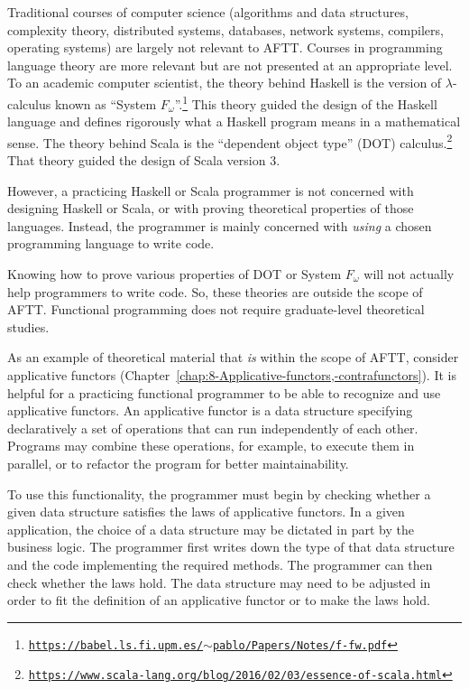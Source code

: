 Traditional courses of computer science (algorithms and data structures,
complexity theory, distributed systems, databases, network systems,
compilers, operating systems) are largely not relevant to AFTT. Courses
in programming language theory are more relevant but are not presented
at an appropriate level. To an academic computer scientist, the theory
behind Haskell is the version of $\lambda$-calculus known as
\textsf{``}System $F_{\omega}$\textsf{''}.\footnote{\texttt{\href{https://babel.ls.fi.upm.es/~pablo/Papers/Notes/f-fw.pdf}{https://babel.ls.fi.upm.es/$\sim$pablo/Papers/Notes/f-fw.pdf}}}
This theory guided the design of the Haskell language and defines
rigorously what a Haskell program means in a mathematical sense. The
theory behind Scala is the \textsf{``}dependent object type\textsf{''} (DOT) calculus.\footnote{\texttt{\href{https://www.scala-lang.org/blog/2016/02/03/essence-of-scala.html}{https://www.scala-lang.org/blog/2016/02/03/essence-of-scala.html}}}
That theory guided the design of Scala version 3.

However, a practicing Haskell or Scala programmer is not concerned
with designing Haskell or Scala, or with proving theoretical properties
of those languages. Instead, the programmer is mainly concerned with
\emph{using} a chosen programming language to write code. 

Knowing how to prove various properties of DOT or System $F_{\omega}$
will not actually help programmers to write code. So, these theories
are outside the scope of AFTT. Functional programming does not require
graduate-level theoretical studies.

As an example of theoretical material that \emph{is} within the scope
of AFTT, consider applicative functors (Chapter~\ref{chap:8-Applicative-functors,-contrafunctors}).
It is helpful for a practicing functional programmer to be able to
recognize and use applicative functors. An applicative functor is
a data structure specifying declaratively a set of operations that
can run independently of each other. Programs may combine these operations,
for example, to execute them in parallel, or to refactor the program
for better maintainability.

To use this functionality, the programmer must begin by checking whether
a given data structure satisfies the laws of applicative functors.
In a given application, the choice of a data structure may be dictated
in part by the business logic. The programmer first writes down the
type of that data structure and the code implementing the required
methods. The programmer can then check whether the laws hold. The
data structure may need to be adjusted in order to fit the definition
of an applicative functor or to make the laws hold.

